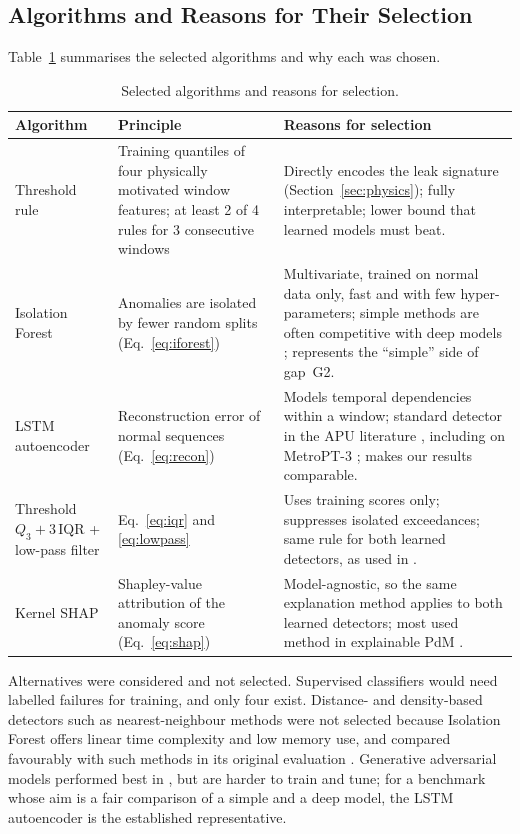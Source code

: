 \subsection{Algorithms and Reasons for Their Selection}
Table~\ref{tab:algorithms} summarises the selected algorithms and why each was chosen.

\begin{table}[H]
\centering
\small
\caption{Selected algorithms and reasons for selection.}
\label{tab:algorithms}
\begin{tabular}{p{2.6cm}p{4.3cm}p{7.3cm}}
\toprule
Algorithm & Principle & Reasons for selection \\
\midrule
Threshold rule & Training quantiles of four physically motivated window features; at least 2 of 4 rules for 3 consecutive windows & Directly encodes the leak signature (Section~\ref{sec:physics}); fully interpretable; lower bound that learned models must beat. \\
\addlinespace
Isolation Forest \citep{liu2008isolation} & Anomalies are isolated by fewer random splits (Eq.~\ref{eq:iforest}) & Multivariate, trained on normal data only, fast and with few hyper-parameters; simple methods are often competitive with deep models \citep{schmidl2022anomaly}; represents the ``simple'' side of gap~G2. \\
\addlinespace
LSTM autoencoder \citep{malhotra2016lstm} & Reconstruction error of normal sequences (Eq.~\ref{eq:recon}) & Models temporal dependencies within a window; standard detector in the APU literature \citep{silva2023adversarial,gama2024neurosymbolic}, including on MetroPT-3 \citep{davari2024explaining}; makes our results comparable. \\
\addlinespace
Threshold $Q_3+3\,\mathrm{IQR}$ + low-pass filter & Eq.~\ref{eq:iqr} and \ref{eq:lowpass} & Uses training scores only; suppresses isolated exceedances; same rule for both learned detectors, as used in \citep{silva2023adversarial,ribeiro2016sequential}. \\
\addlinespace
Kernel SHAP \citep{lundberg2017shap} & Shapley-value attribution of the anomaly score (Eq.~\ref{eq:shap}) & Model-agnostic, so the same explanation method applies to both learned detectors; most used method in explainable PdM \citep{cummins2024xpdm}. \\
\bottomrule
\end{tabular}
\end{table}

Alternatives were considered and not selected. Supervised classifiers would need labelled failures for training, and only four exist. Distance- and density-based detectors such as nearest-neighbour methods were not selected because Isolation Forest offers linear time complexity and low memory use, and compared favourably with such methods in its original evaluation \citep{liu2008isolation}. Generative adversarial models performed best in \citet{silva2023adversarial}, but are harder to train and tune; for a benchmark whose aim is a fair comparison of a simple and a deep model, the LSTM autoencoder is the established representative.

